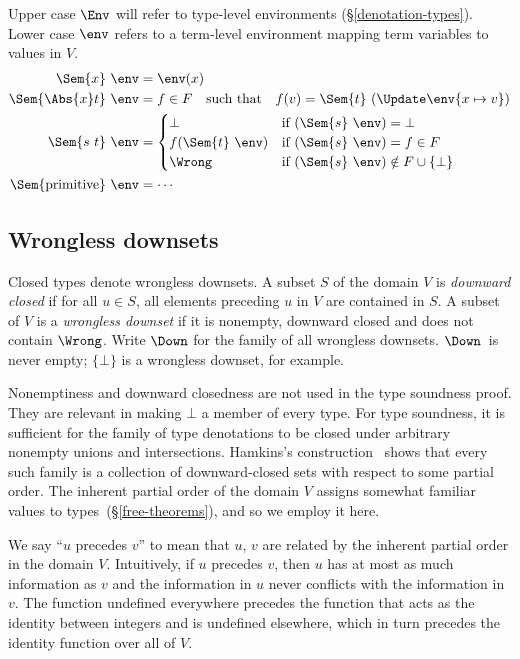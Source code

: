 \documentclass{amsart}
\theoremstyle{definition}
\begin{document}
Upper case $\Env$ will refer to type-level environments
(\S\ref{denotation-types}). Lower case $\env$ refers to a
term-level environment mapping term variables to values in $V$.
\begin{align*}
\Sem{x}~\env&=\env(x)\\
\Sem{\Abs{x}t}~\env&=
  f\in F\text{\quad such that\quad}
  f(v)=\Sem{t}~(\Update\env{x\mapsto v})
\\
\Sem{s~t}~\env&=
\begin{cases}
\bot&\text{if }(\Sem{s}~\env)=\bot
\\
f(\Sem{t}~\env)&\text{if }(\Sem{s}~\env)=f\in F
\\
\Wrong&\text{if }(\Sem{s}~\env)\notin F\cup\{\bot\}
\end{cases}
\\
\Sem{\mathrm{primitive}}~\env&=\cdots
\end{align*}

\subsection{Wrongless downsets}
\label{wrongless}
Closed types denote wrongless downsets. A subset $S$ of the
domain $V$ is \emph{downward closed} if for all $u\in S$, all
elements preceding $u$ in $V$ are contained in $S$. A subset of
$V$ is a \emph{wrongless downset} if it is nonempty, downward
closed and does not contain $\Wrong$. Write $\Down$ for the
family of all wrongless downsets. $\Down$~is never empty;
$\{\bot\}$ is a wrongless downset, for example.

Nonemptiness and downward closedness are not used in the type
soundness proof. They are relevant in making $\bot$ a member of
every type. For type soundness, it is sufficient for the family
of type denotations to be closed under arbitrary nonempty unions
and intersections. Hamkins's construction~\cite{Hamkins10} shows
that every such family is a collection of downward-closed sets
with respect to some partial order. The inherent partial order of
the domain $V$ assigns somewhat familiar values to
types~(\S\ref{free-theorems}), and so we employ it here.

We say ``$u$ precedes $v$'' to mean that $u$, $v$ are related by
the inherent partial order in the domain $V$. Intuitively, if $u$
precedes $v$, then $u$ has at most as much information as $v$ and
the information in $u$ never conflicts with the information in
$v$. The function undefined everywhere precedes the function that
acts as the identity between integers and is undefined elsewhere,
which in turn precedes the identity function over all of $V$.
\end{document}
